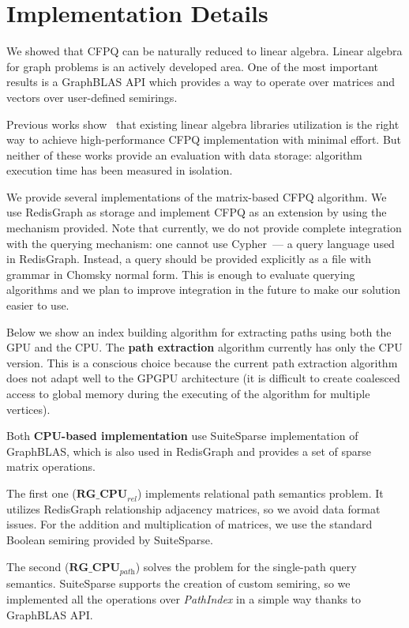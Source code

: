 \section{Implementation Details}

We showed that CFPQ can be naturally reduced to linear algebra.
Linear algebra for graph problems is an actively developed area.
One of the most important results is a GraphBLAS API which provides a way to operate over matrices and vectors over user-defined semirings.

Previous works show~\cite{Mishin:2019:ECP:3327964.3328503, Azimov:2018:CPQ:3210259.3210264} that existing linear algebra libraries utilization is the right way to achieve high-performance CFPQ implementation with minimal effort.
But neither of these works provide an evaluation with data storage: algorithm execution time has been measured in isolation.

We provide several implementations of the matrix-based CFPQ algorithm.
We use RedisGraph as storage and implement CFPQ as an extension by using the mechanism provided.
Note that currently, we do not provide complete integration with the querying mechanism: one cannot use Cypher~--- a query language used in RedisGraph.
Instead, a query should be provided explicitly as a file with grammar in Chomsky normal form.
This is enough to evaluate querying algorithms and we plan to improve integration in the future to make our solution easier to use. 

Below we show an index building algorithm for extracting paths using both the GPU and the CPU. The \textbf{path extraction} algorithm currently has only the CPU version. This is a conscious choice because the current path extraction algorithm does not adapt well to the GPGPU architecture (it is difficult to create coalesced access to global memory during the executing of the algorithm for multiple vertices).

Both \textbf{CPU-based implementation} use SuiteSparse implementation of GraphBLAS, which is also used in RedisGraph and provides a set of sparse matrix operations.

The first one ($\textbf{RG\_CPU}_{\textit{rel}}$) implements relational path semantics problem. It utilizes RedisGraph relationship adjacency matrices, so we avoid data format issues. For the addition and multiplication of matrices, we use the standard Boolean semiring provided by SuiteSparse.

The second ($\textbf{RG\_CPU}_{\textit{path}}$) solves the problem for the single-path query semantics. SuiteSparse supports the creation of custom semiring, so we implemented all the operations over \textit{PathIndex} in a simple way thanks to GraphBLAS API.

